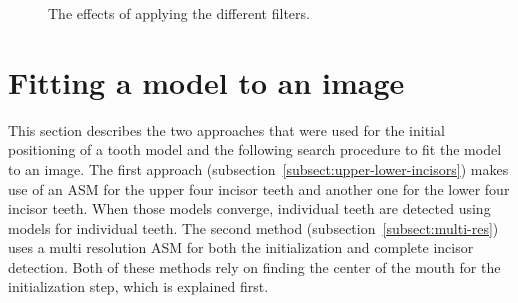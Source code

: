 \documentclass[a4paper]{article}
\begin{document}
\begin{figure}[H]
    \qquad
    \caption{The effects of applying the different filters.}
  \label{fig:preprocessing}
\end{figure}



\section{Fitting a model to an image}
\label{sect:init-estimate}
This section describes the two approaches that were used for the initial positioning of a tooth model and the following search procedure to fit the model to an image.
The first approach (subsection~\ref{subsect:upper-lower-incisors}) makes use of an ASM for the upper four incisor teeth and another one for the lower four incisor teeth.
When those models converge, individual teeth are detected using models for individual teeth.
The second method (subsection~\ref{subsect:multi-res}) uses a multi resolution ASM for both the initialization and complete incisor detection.
Both of these methods rely on finding the center of the mouth for the initialization step, which is explained first.
\end{document}
